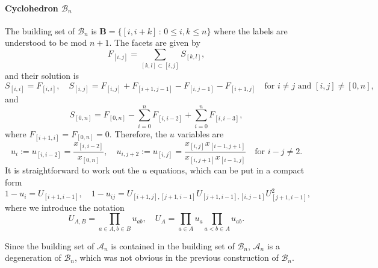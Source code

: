 \documentclass[hidelinks,12pt]{article}
\begin{document}
\paragraph{Cyclohedron $\mathscr B_n$} The building set of $\mathscr B_n$ is $\mathbf B=\{[i,i+k]\,:\,0\leq i, k\leq n\}$ where the labels are understood to be mod $n+1$. The facets are given by 
\[
F_{[i,j]}=\sum_{[k,l]\subset [i,j]}S_{[k,l]},
\]
and their solution is 
\[
	S_{[i,i]}=F_{[i,i]},\quad S_{[i,j]}=F_{[i,j]}+F_{[i+1,j-1]}-F_{[i,j-1]}-F_{[i+1,j]}\quad \text{for $i\neq j$ and $[i,j]\neq [0,n]$},
\]
and
\[
	S_{[0,n]}=F_{[0,n]}-\sum_{i=0}^n F_{[i,i-2]} +\sum_{i=0}^n F_{[i,i-3]},
\]
where $F_{[i+1,i]}=F_{[0,n]}=0$. Therefore, the $u$ variables are
\begin{equation}
   u_i:=u_{[i,i-2]}=\frac{x_{[i,i-2]}}{x_{[0,n]}},\quad 
u_{i,j+2}:=u_{[i,j]}=\frac{x_{[i,j]}x_{[i-1,j+1]}}{x_{[i,j+1]}x_{[i-1,j]}}
\quad \text{for $i-j\neq 2$}.  \label{uvarforBn}
\end{equation}
It is straightforward to work out the $u$ equations, which can be put in a compact form~\cite{Arkani-Hamed:2019plo}
\begin{equation}\label{Bueq}
1-u_i=U_{[i+1,i-1]},\quad 
1-u_{ij}=U_{[i+1,j],[j+1,i-1]}U_{[j+1,i-1],[i,j-1]}U^2_{[j+1,i-1]},
\end{equation}
where we introduce the notation 
\[
U_{A,B}=\prod_{a\in A,b\in B}u_{ab},\quad 
U_A=\prod_{a\in A}u_a\prod_{a<b\in A}u_{ab}.
\]

Since the building set of $\mathscr A_n$ is contained in the building set of $\mathscr B_n$, $\mathscr A_n$ is a degeneration of $\mathscr B_n$, which was not obvious in the previous construction of $\mathscr B_n$.  
\end{document}

